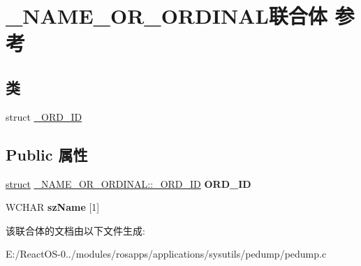 \hypertarget{union___n_a_m_e___o_r___o_r_d_i_n_a_l}{}\section{\+\_\+\+N\+A\+M\+E\+\_\+\+O\+R\+\_\+\+O\+R\+D\+I\+N\+A\+L联合体 参考}
\label{union___n_a_m_e___o_r___o_r_d_i_n_a_l}
\subsection*{类}
\begin{DoxyCompactItemize}
\item 
struct \hyperlink{struct___n_a_m_e___o_r___o_r_d_i_n_a_l_1_1___o_r_d___i_d}{\+\_\+\+O\+R\+D\+\_\+\+ID}
\end{DoxyCompactItemize}
\subsection*{Public 属性}
\begin{DoxyCompactItemize}
\item 
\mbox{\label{union___n_a_m_e___o_r___o_r_d_i_n_a_l_a6557c173f3b3862ba46198ea246cdf43}} 
\hyperlink{interfacestruct}{struct} \hyperlink{struct___n_a_m_e___o_r___o_r_d_i_n_a_l_1_1___o_r_d___i_d}{\+\_\+\+N\+A\+M\+E\+\_\+\+O\+R\+\_\+\+O\+R\+D\+I\+N\+A\+L\+::\+\_\+\+O\+R\+D\+\_\+\+ID} {\bfseries O\+R\+D\+\_\+\+ID}
\item 
\mbox{\label{union___n_a_m_e___o_r___o_r_d_i_n_a_l_a681d5f1e0dee469a87ed79fb62cb3d4e}} 
W\+C\+H\+AR {\bfseries sz\+Name} \mbox{[}1\mbox{]}
\end{DoxyCompactItemize}


该联合体的文档由以下文件生成\+:\begin{DoxyCompactItemize}
\item 
E\+:/\+React\+O\+S-\/0../modules/rosapps/applications/sysutils/pedump/pedump.\+c\end{DoxyCompactItemize}
